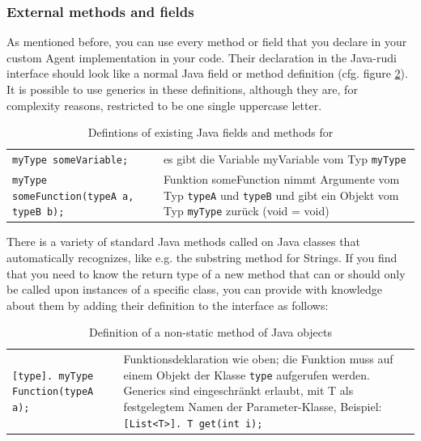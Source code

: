 \subsubsection{External methods and fields}
\label{sec:javatypes}

As mentioned before, you can use every method or field that you declare in your custom Agent implementation in your \vonda code. Their declaration in the Java-rudi interface should look like a normal Java field or method definition (cfg. figure \ref{tab:typeinference}). It is possible to use generics in these definitions, although they are, for complexity reasons, restricted to be one single uppercase letter.

\begin{table}[htbp]
  \centering
  \small
  \begin{tabular}{lp{}}
    \texttt{myType someVariable;}
    &  es gibt die Variable myVariable vom Typ \texttt{myType} \\

    \texttt{myType someFunction(typeA a, typeB b);}
    &  Funktion someFunction nimmt Argumente vom Typ \texttt{typeA} und
      \texttt{typeB} und gibt ein Objekt vom Typ \texttt{myType} zurück (void =
      void)
  \end{tabular}

  \caption{Defintions of existing Java fields and methods for \vonda}
  \label{tab:typeinference}
\end{table}

There is a variety of standard Java methods called on Java classes that \vonda automatically recognizes, like e.g. the substring method for Strings. If you find that you need \vonda to know the return type of a new method that can or should only be called upon instances of a specific class, you can provide \vonda with knowledge about them by adding their definition to the interface as follows:


\begin{table}[htbp]
  \centering
  \small
  \begin{tabular}{lp{}}

    \texttt{[type]. myType Function(typeA a);}
    & Funktionsdeklaration wie oben; die Funktion muss auf einem Objekt der
      Klasse \texttt{type} aufgerufen werden. Generics sind eingeschränkt
      erlaubt, mit T als festgelegtem Namen der Parameter-Klasse,
      Beispiel:\newline\texttt{[List<T>]. T get(int i);}
  \end{tabular}

  \caption{Definition of a non-static method of Java objects}
  \label{tab:typeinference}
\end{table}

